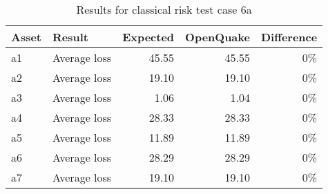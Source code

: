 \begin{table}[htbp]

\centering
\begin{tabular}{ l l r r r }

\hline
\rowcolor{anti-flashwhite}
\bf{Asset} & \bf{Result} & \bf{Expected} & \bf{OpenQuake} & \bf{Difference}\\
\hline
a1 & Average loss & 45.55 & 45.55 & 0\% \\
a2 & Average loss & 19.10 & 19.10 & 0\% \\
a3 & Average loss & 1.06 & 1.04 & 0\% \\
a4 & Average loss & 28.33 & 28.33 & 0\% \\
a5 & Average loss & 11.89 & 11.89 & 0\% \\
a6 & Average loss & 28.29 & 28.29 & 0\% \\
a7 & Average loss & 19.10 & 19.10 & 0\% \\
\hline
\end{tabular}

\caption{Results for classical risk test case 6a}
\label{tab:result-cr-6a}
\end{table}